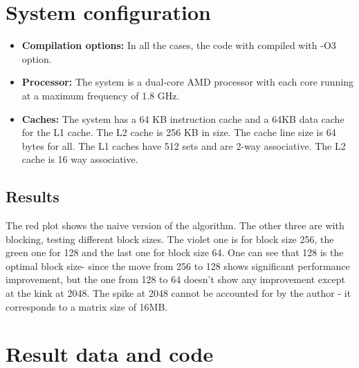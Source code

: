 \documentclass[a4paper]{article}
\begin{document}
\section{\color{db}System configuration}
\begin{itemize}
\item \textbf{Compilation options:} In all the cases, the code with compiled with -O3 option.
\item \textbf{Processor:} The system is a dual-core AMD processor with each core running at a maximum frequency of 1.8 GHz. 
\item \textbf{Caches:} The system has a 64 KB instruction cache and a 64KB data cache for the L1 cache. The L2 cache is 256 KB in size.
The cache line size is 64 bytes for all. The L1 caches have 512 sets and are 2-way associative. The L2 cache is 16 way associative.
\end{itemize}


\clearpage
\subsection{\color{grey}Results}
The red plot shows the naive version of the algorithm. The other three are with blocking, testing different block sizes. The violet one is for block size 256,
the green one for 128 and the last one for block size 64. One can see that 128 is the optimal block size- since the move from 256 to 128 shows significant performance improvement, 
but the one from 128 to 64 doesn't show any improvement except at the kink at 2048.
The spike at 2048 cannot be accounted for by the author - it corresponds to a matrix size of 16MB. 




\section{\color{db}Result data and code}
\end{document}
